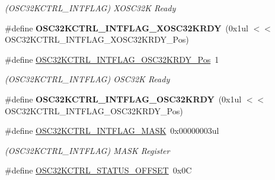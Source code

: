 \begin{DoxyCompactItemize}
\begin{DoxyCompactList}\small\item\em (O\+S\+C32\+K\+C\+T\+R\+L\+\_\+\+I\+N\+T\+F\+L\+A\+G) X\+O\+S\+C32\+K Ready \end{DoxyCompactList}\item 
\hypertarget{group___s_a_m_l21___o_s_c32_k_c_t_r_l_ga928db90e1b2498fad008f00b1f14567d}{}\#define {\bfseries O\+S\+C32\+K\+C\+T\+R\+L\+\_\+\+I\+N\+T\+F\+L\+A\+G\+\_\+\+X\+O\+S\+C32\+K\+R\+D\+Y}~(0x1ul $<$$<$ O\+S\+C32\+K\+C\+T\+R\+L\+\_\+\+I\+N\+T\+F\+L\+A\+G\+\_\+\+X\+O\+S\+C32\+K\+R\+D\+Y\+\_\+\+Pos)\label{group___s_a_m_l21___o_s_c32_k_c_t_r_l_ga928db90e1b2498fad008f00b1f14567d}

\item 
\hypertarget{group___s_a_m_l21___o_s_c32_k_c_t_r_l_ga6159f41ec2004a6766ae0b02531c3966}{}\#define \hyperlink{group___s_a_m_l21___o_s_c32_k_c_t_r_l_ga6159f41ec2004a6766ae0b02531c3966}{O\+S\+C32\+K\+C\+T\+R\+L\+\_\+\+I\+N\+T\+F\+L\+A\+G\+\_\+\+O\+S\+C32\+K\+R\+D\+Y\+\_\+\+Pos}~1\label{group___s_a_m_l21___o_s_c32_k_c_t_r_l_ga6159f41ec2004a6766ae0b02531c3966}

\begin{DoxyCompactList}\small\item\em (O\+S\+C32\+K\+C\+T\+R\+L\+\_\+\+I\+N\+T\+F\+L\+A\+G) O\+S\+C32\+K Ready \end{DoxyCompactList}\item 
\hypertarget{group___s_a_m_l21___o_s_c32_k_c_t_r_l_gaa17e4a32bb68f2fa5d9505c3bd071ead}{}\#define {\bfseries O\+S\+C32\+K\+C\+T\+R\+L\+\_\+\+I\+N\+T\+F\+L\+A\+G\+\_\+\+O\+S\+C32\+K\+R\+D\+Y}~(0x1ul $<$$<$ O\+S\+C32\+K\+C\+T\+R\+L\+\_\+\+I\+N\+T\+F\+L\+A\+G\+\_\+\+O\+S\+C32\+K\+R\+D\+Y\+\_\+\+Pos)\label{group___s_a_m_l21___o_s_c32_k_c_t_r_l_gaa17e4a32bb68f2fa5d9505c3bd071ead}

\item 
\hypertarget{group___s_a_m_l21___o_s_c32_k_c_t_r_l_ga7265e7d7ad5a14c6c1c13035721290c2}{}\#define \hyperlink{group___s_a_m_l21___o_s_c32_k_c_t_r_l_ga7265e7d7ad5a14c6c1c13035721290c2}{O\+S\+C32\+K\+C\+T\+R\+L\+\_\+\+I\+N\+T\+F\+L\+A\+G\+\_\+\+M\+A\+S\+K}~0x00000003ul\label{group___s_a_m_l21___o_s_c32_k_c_t_r_l_ga7265e7d7ad5a14c6c1c13035721290c2}

\begin{DoxyCompactList}\small\item\em (O\+S\+C32\+K\+C\+T\+R\+L\+\_\+\+I\+N\+T\+F\+L\+A\+G) M\+A\+S\+K Register \end{DoxyCompactList}\item 
\hypertarget{group___s_a_m_l21___o_s_c32_k_c_t_r_l_gaac54085818ba483d7ee48d673dee16a4}{}\#define \hyperlink{group___s_a_m_l21___o_s_c32_k_c_t_r_l_gaac54085818ba483d7ee48d673dee16a4}{O\+S\+C32\+K\+C\+T\+R\+L\+\_\+\+S\+T\+A\+T\+U\+S\+\_\+\+O\+F\+F\+S\+E\+T}~0x0\+C\label{group___s_a_m_l21___o_s_c32_k_c_t_r_l_gaac54085818ba483d7ee48d673dee16a4}


\end{DoxyCompactItemize}
